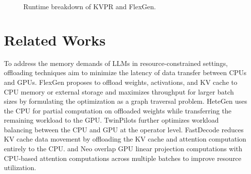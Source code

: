 \documentclass[11pt]{article}
\newcommand{\paperName}{KVPR}
\begin{document}
\begin{figure}[h]

\caption{Runtime breakdown of {\paperName} and FlexGen.}
\label{fig:ablation-runtime}
\end{figure}





\section{Related Works}

To address the memory demands of LLMs in resource-constrained settings, offloading techniques aim to minimize the latency of data transfer between CPUs and GPUs. FlexGen \cite{sheng2023flexgen} proposes to offload weights, activations, and KV cache to CPU memory or external storage and maximizes throughput for larger batch sizes by formulating the optimization as a graph traversal problem. HeteGen \cite{zhao2024hetegen} uses the CPU for partial computation on offloaded weights while transferring the remaining workload to the GPU. TwinPilots \cite{yu2024twinpilots} further optimizes workload balancing between the CPU and GPU at the operator level. 
FastDecode \cite{he2024fastdecode} reduces KV cache data movement by offloading the KV cache and attention computation entirely to the CPU. 
\citeauthor{park2024improving} and Neo \cite{jiang2024neo} overlap GPU linear projection computations with CPU-based attention computations across multiple batches to improve resource utilization.
\end{document}
